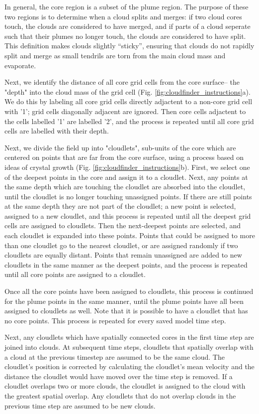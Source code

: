 \documentclass[acp]{copernicus}
\begin{document}
In general, the core region is a subset of the plume region.  The purpose of 
these two regions is to determine when a cloud splits and merges: if two cloud 
cores touch, the clouds are considered to have merged, and if parts of a cloud 
seperate such that their plumes no longer touch, the clouds are considered to 
have split.  This definition makes clouds slightly ``sticky'', ensuring that 
clouds do not rapidly split and merge as small tendrils are torn from the main 
cloud mass and evaporate.

Next, we identify the distance of all core grid cells from the core surface--
the "depth" into the cloud mass of the grid cell (Fig. 
\ref{fig:cloudfinder_instructions}a).  We do this by labeling all core grid 
cells directly adjactent to a non-core grid cell with '1'; grid cells 
diagonally adjacent are ignored.  Then core cells adjactent to the cells 
labelled '1' are labelled '2', and the process is repeated until all core grid 
cells are labelled with their depth.

Next, we divide the field up into "cloudlets", sub-units of the core which are 
centered on points that are far from the core surface, using a process based 
on ideas of crystal growth (Fig. \ref{fig:cloudfinder_instructions}b).  First, 
we select one of the deepest points in the core and assign it to a cloudlet.  
Next, any points at the same depth which are touching the cloudlet are absorbed 
into the cloudlet, until the cloudlet is no longer touching unassigned points.  
If there are still points at the same depth they are not part of the cloudlet; 
a new point is selected, assigned to a new cloudlet, and this process is 
repeated until all the deepest grid cells are assigned to cloudlets.  Then the 
next-deepest points are selected, and each cloudlet is expanded into these 
points.  Points that could be assigned to more than one cloudlet go to the 
nearest cloudlet, or are assigned randomly if two cloudlets are equally 
distant.  Points that remain unassigned are added to new cloudlets in the same 
manner as the deepest points, and the process is repeated until all core points 
are assigned to a cloudlet.

Once all the core points have been assigned to cloudlets, this process is 
continued for the plume points in the same manner, until the plume points have 
all been assigned to cloudlets as well.  Note that it is possible to have a 
cloudlet that has no core points.  This process is repeated for every saved 
model time step.

Next, any cloudlets which have spatially connected cores in the first time step 
are joined into clouds.  At subsequent time steps, cloudlets that spatially 
overlap with a cloud at the previous timestep are assumed to be the same cloud.
The cloudlet's position is corrected by calculating the cloudlet's mean 
velocity and the distance the cloudlet would have moved over the time step is 
removed.  If a cloudlet overlaps two or more clouds, the cloudlet is assigned 
to the cloud with the greatest spatial overlap.  Any cloudlets that do not 
overlap clouds in the previous time step are assumed to be new clouds.
\end{document}
